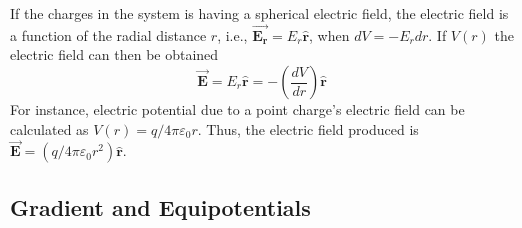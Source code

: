 If the charges in the system is having a spherical electric field, the electric field is a function of the radial distance $r$, i.e., $\vec{\boldsymbol{E_r}}=E_r\hat{\boldsymbol{r}}$, when $dV = -E_r dr$. If $V(r)$ the electric field can then be obtained
\begin{equation*}
  \vec{\boldsymbol{E}} = E_r\hat{\boldsymbol{r}} = -\left( \frac{dV}{dr} \right)\hat{\boldsymbol{r}}
\end{equation*}
For instance, electric potential due to a point charge's electric field can be calculated as $V(r)=q/4\pi\varepsilon_0 r$. Thus, the electric field produced is $\vec{\boldsymbol{E}}=(q/4\pi\varepsilon_0 r^2)\hat{\boldsymbol{r}}$.



\subsection{Gradient and Equipotentials}

